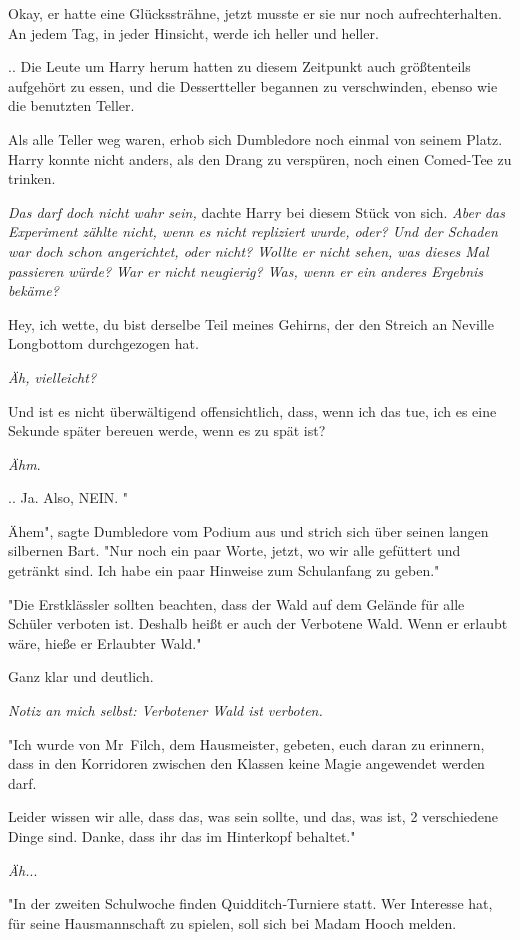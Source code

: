 {Okay, er hatte eine Glückssträhne, jetzt musste er sie nur noch aufrechterhalten. An jedem Tag, in jeder Hinsicht, werde ich heller und heller.

.. Die Leute um Harry herum hatten zu diesem Zeitpunkt auch größtenteils aufgehört zu essen, und die Dessertteller begannen zu verschwinden, ebenso wie die benutzten Teller.

Als alle Teller weg waren, erhob sich Dumbledore noch einmal von seinem Platz. Harry konnte nicht anders, als den Drang zu verspüren, noch einen Comed-Tee zu trinken.

\emph{Das darf doch nicht wahr sein,} dachte Harry bei diesem Stück von sich. \emph{Aber das Experiment zählte nicht, wenn es nicht repliziert wurde, oder? Und der Schaden war doch schon angerichtet, oder nicht? Wollte er nicht sehen, was dieses Mal passieren würde? War er nicht neugierig? Was, wenn er ein anderes Ergebnis bekäme?}

Hey, ich wette, du bist derselbe Teil meines Gehirns, der den Streich an Neville Longbottom durchgezogen hat.

\emph{Äh, vielleicht?}

Und ist es nicht überwältigend offensichtlich, dass, wenn ich das tue, ich es eine Sekunde später bereuen werde, wenn es zu spät ist?

\emph{Ähm}.

.. Ja. Also, NEIN. "

Ähem", sagte Dumbledore vom Podium aus und strich sich über seinen langen silbernen Bart. "Nur noch ein paar Worte, jetzt, wo wir alle gefüttert und getränkt sind. Ich habe ein paar Hinweise zum Schulanfang zu geben."

"Die Erstklässler sollten beachten, dass der Wald auf dem Gelände für alle Schüler verboten ist. Deshalb heißt er auch der Verbotene Wald. Wenn er erlaubt wäre, hieße er Erlaubter Wald."

Ganz klar und deutlich.

\emph{Notiz an mich selbst: Verbotener Wald ist verboten.}

"Ich wurde von Mr~Filch, dem Hausmeister, gebeten, euch daran zu erinnern, dass in den Korridoren zwischen den Klassen keine Magie angewendet werden darf.

Leider wissen wir alle, dass das, was sein sollte, und das, was ist, 2 verschiedene Dinge sind. Danke, dass ihr das im Hinterkopf behaltet."

\emph{Äh.}..

"In der zweiten Schulwoche finden Quidditch-Turniere statt. Wer Interesse hat, für seine Hausmannschaft zu spielen, soll sich bei Madam Hooch melden.

}
